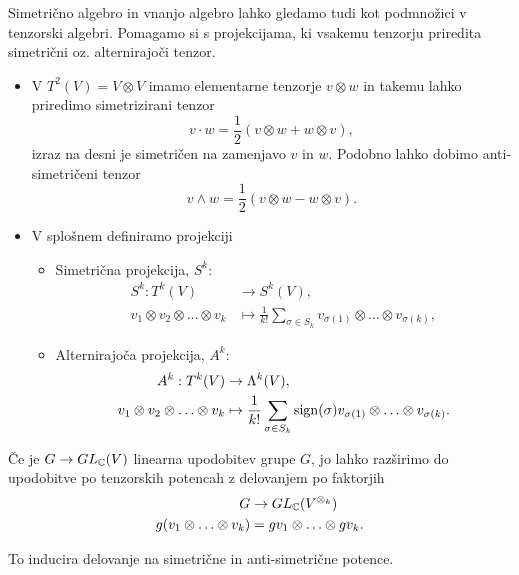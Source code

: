 Simetri\v cno algebro in vnanjo algebro lahko gledamo tudi kot podmno\v zici v tenzorski algebri. Pomagamo si s projekcijama, ki
vsakemu tenzorju priredita simetri\v cni oz. alternirajo\v ci tenzor.
\begin{itemize}
	\item{V $T^2(V) = V \otimes V$ imamo elementarne tenzorje $v \otimes w$ in takemu lahko priredimo simetrizirani tenzor
		\[
			v \cdot w = \frac{1}{2}(v \otimes w + w \otimes v),
		\]
		izraz na desni je simetri\v cen na zamenjavo $v$ in $w$. Podobno lahko dobimo anti-simetri\v ceni tenzor
		\[
			v \wedge w = \frac{1}{2}(v \otimes w - w \otimes v).
		\]}
	\item{V splo\v snem definiramo projekciji
		\begin{itemize}
			\item{Simetri\v cna projekcija, $S^k$:
				\begin{align*}
					S^k : T^k (V) &\to S^k (V), \\
					v_1 \otimes v_2 \otimes \ldots \otimes v_k &\mapsto \frac{1}{k!}\sum_{\sigma \in S_k}
						v_{\sigma(1)} \otimes \ldots \otimes v_{\sigma(k)},
				\end{align*}}
			\item{Alternirajo\v ca projekcija, $A^k$:
				\begin{align*}
					A^k : T^k (V) &\to \Lambda^k (V), \\
					v_1 \otimes v_2 \otimes \ldots \otimes v_k &\mapsto \frac{1}{k!}\sum_{\sigma \in S_k}
						\operatorname{sign}(\sigma) v_{\sigma(1)} \otimes \ldots \otimes v_{\sigma(k)}.
				\end{align*}}
		\end{itemize}}
\end{itemize}

\v Ce je $G \to GL_{\mathbb{C}}(V)$ linearna upodobitev grupe $G$, jo lahko raz\v sirimo do upodobitve po tenzorskih potencah z delovanjem
po faktorjih
\begin{align*}
	G &\to GL_{\mathbb{C}}(V^{\otimes_k}) \\
	g(v_1 \otimes \ldots \otimes v_k) &= gv_1 \otimes \ldots \otimes gv_k.
\end{align*}

\ni To inducira delovanje na simetri\v cne in anti-simetri\v cne potence.

